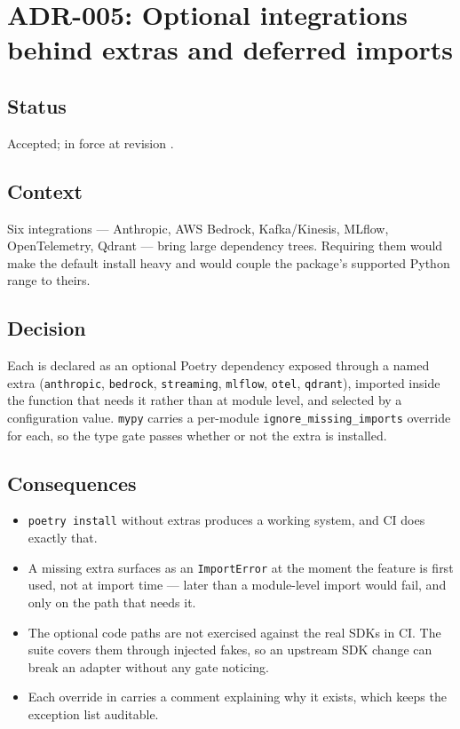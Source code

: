 \section{ADR-005: Optional integrations behind extras and deferred imports}
\label{adr:005}

\subsection*{Status}

Accepted; in force at revision \texttt{\projectrevisionshort}.

\subsection*{Context}

Six integrations --- Anthropic, AWS Bedrock, Kafka/Kinesis, MLflow,
OpenTelemetry, Qdrant --- bring large dependency trees. Requiring them would
make the default install heavy and would couple the package's supported Python
range to theirs.

\subsection*{Decision}

Each is declared as an optional Poetry dependency exposed through a named
extra (\texttt{anthropic}, \texttt{bedrock}, \texttt{streaming},
\texttt{mlflow}, \texttt{otel}, \texttt{qdrant}), imported inside the function
that needs it rather than at module level, and selected by a configuration
value. \texttt{mypy} carries a per-module \texttt{ignore\_missing\_imports}
override for each, so the type gate passes whether or not the extra is
installed.

\subsection*{Consequences}

\begin{itemize}
  \item \texttt{poetry install} without extras produces a working system, and
    CI does exactly that.
  \item A missing extra surfaces as an \texttt{ImportError} at the moment the
    feature is first used, not at import time --- later than a module-level
    import would fail, and only on the path that needs it.
  \item The optional code paths are not exercised against the real SDKs in CI.
    The suite covers them through injected fakes, so an upstream SDK change can
    break an adapter without any gate noticing.
  \item Each override in  carries a comment explaining
    why it exists, which keeps the exception list auditable.
\end{itemize}

